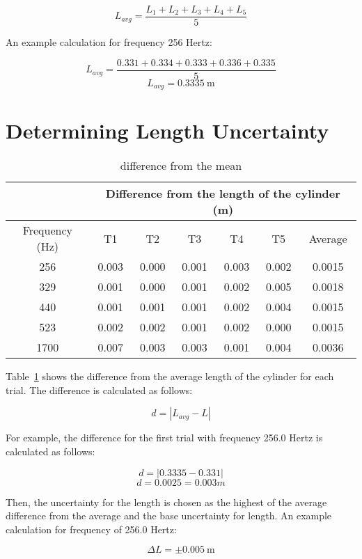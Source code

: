 \documentclass{report}
\begin{document}
\[L_{avg}=\frac{L_1+L_2+L_3+L_4+L_5}{5}\]

An example calculation for frequency 256 Hertz:

\[L_{avg}=\frac{0.331+0.334+0.333+0.336+0.335}{5}\]
\[L_{avg}=\SI{0.3335}{\metre}\]

\section{Determining Length Uncertainty}

\begin{table}[H]
  \centering
  \begin{tabular}{@{}ccccccc@{}}
    \toprule
    & \multicolumn{6}{c}{Difference from the length of the cylinder
    (m)} \\ \midrule
    Frequency (Hz) & T1        & T2       & T3       & T4       & T5
    & Average    \\
    256            & 0.003     & 0.000    & 0.001    & 0.003    &
    0.002    & 0.0015     \\
    329            & 0.001     & 0.000    & 0.001    & 0.002    &
    0.005    & 0.0018     \\
    440            & 0.001     & 0.001    & 0.001    & 0.002    &
    0.004    & 0.0015     \\
    523            & 0.002     & 0.002    & 0.001    & 0.002    &
    0.000    & 0.0015     \\
    1700           & 0.007     & 0.003    & 0.003    & 0.001    &
    0.004    & 0.0036     \\ \bottomrule
  \end{tabular}
  \caption{difference from the mean}\label{tab:diff-from-mean}
\end{table}

Table~\ref{tab:diff-from-mean} shows the difference from the average
length of the cylinder
for each trial. The difference is calculated as follows:

\[d=|L_{avg}-L|\]

For example, the difference for the first trial with frequency 256.0
Hertz is calculated as follows:

\[d=|0.3335-0.331|\]
\[d=0.0025=0.003 m\]

Then, the uncertainty for the length is chosen as the highest of the
average difference from the average and the base uncertainty for
length. An example calculation for frequency of 256.0 Hertz:

\[\Delta L=\pm\SI{0.005}{\metre}\]
\end{document}
